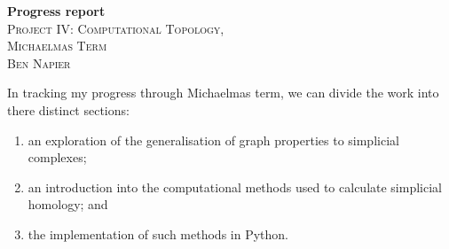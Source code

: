 





\begin{center}
  \textbf{Progress report} \\
  \textsc{Project IV: Computational Topology, \\ Michaelmas Term} \\
  \textsc{Ben Napier}
  \vspace{1em}
\end{center}

In tracking my progress through Michaelmas term, we can divide the work into there distinct sections:  

\begin{enumerate}
	\item an exploration of the generalisation of graph properties to simplicial complexes;
	\item an introduction into the computational methods used to calculate simplicial homology; and
	\item the implementation of such methods in Python.
\end{enumerate}







